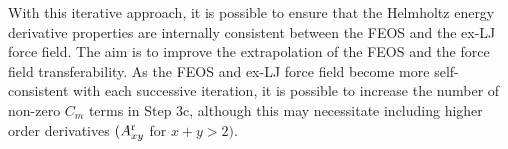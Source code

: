 \documentclass[12pt,a4paper]{article}
\begin{document}


With this iterative approach, it is possible to ensure that the Helmholtz energy derivative properties are internally consistent between the FEOS and the ex-LJ force field. The aim is to improve the extrapolation of the FEOS and the force field transferability. As the FEOS and ex-LJ force field become more self-consistent with each successive iteration, it is possible to increase the number of non-zero $C_m$ terms in Step 3c, although this may necessitate including higher order derivatives $(A_{xy}^{\rm r}$ for $x+y>2)$.

\end{document}
